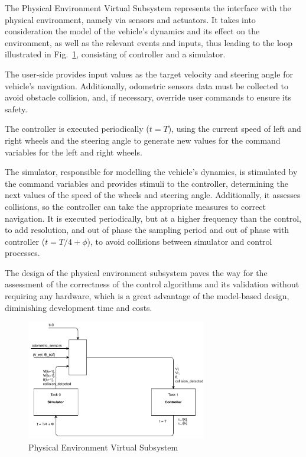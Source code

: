 The Physical Environment Virtual Subsystem represents the interface with the
physical environment, namely via sensors and actuators. It takes into
consideration the model of the vehicle's dynamics and its effect on the
environment, as well as the relevant events and inputs, thus leading to the loop
illustrated in Fig.~\ref{fig:simcontroller}, consisting of controller and a simulator.

The user-side provides input values as the target velocity and steering angle
for vehicle's navigation. Additionally, odometric sensors data must be
collected to avoid obstacle collision, and, if necessary, override user commands
to ensure its safety.

The controller is executed periodically ($t=T$), using the current speed of left
and right wheels and the steering angle to generate new values for the command
variables for the left and right wheels.

The simulator, responsible for modelling the vehicle's dynamics, is stimulated
by the command variables and provides
stimuli to the controller, determining the next values of the speed of the wheels and
steering angle. Additionally, it assesses collisions, so the controller can take
the appropriate measures to correct navigation.
It is executed periodically, but at a higher frequency than the control, to add
resolution, and out of phase the sampling period and out of phase with
controller ($t = T/4 + \phi$), to avoid collisions between simulator and control
processes.

The design of the physical environment subsystem paves the way for the
assessment of the correctness of the control algorithms and its validation
without requiring any hardware, which is a great advantage of the model-based
design, diminishing development time and costs.
%
\begin{figure}[!htbp]
\centering
       \includegraphics[width=0.7\textwidth]{img/sim&control.pdf} 
\caption{Physical Environment Virtual Subsystem}%
\label{fig:simcontroller}
\end{figure}
%
%
